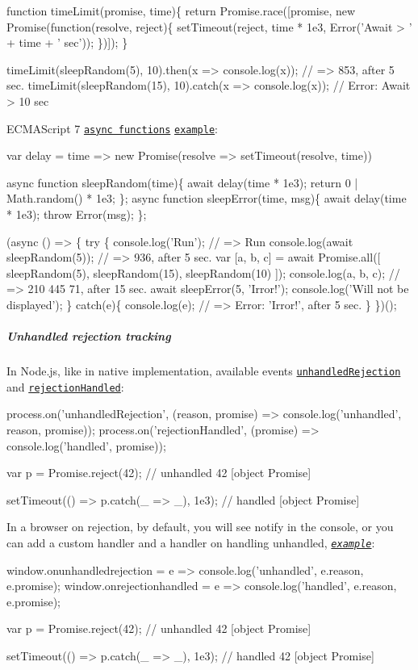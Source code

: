 \begin{DoxyCode}
function timeLimit(promise, time)\{
  return Promise.race([promise, new Promise(function(resolve, reject)\{
    setTimeout(reject, time * 1e3, Error('Await > ' + time + ' sec'));
  \})]);
\}

timeLimit(sleepRandom(5), 10).then(x => console.log(x));   // => 853, after 5 sec.
timeLimit(sleepRandom(15), 10).catch(x => console.log(x)); // Error: Await > 10 sec
\end{DoxyCode}
 E\+C\+M\+A\+Script 7 \href{https://tc39.github.io/ecmascript-asyncawait}{\tt async functions} \href{http://goo.gl/wnQS4j}{\tt example}\+: 
\begin{DoxyCode}
var delay = time => new Promise(resolve => setTimeout(resolve, time))

async function sleepRandom(time)\{
  await delay(time * 1e3);
  return 0 | Math.random() * 1e3;
\};
async function sleepError(time, msg)\{
  await delay(time * 1e3);
  throw Error(msg);
\};

(async () => \{
  try \{
    console.log('Run');                // => Run
    console.log(await sleepRandom(5)); // => 936, after 5 sec.
    var [a, b, c] = await Promise.all([
      sleepRandom(5),
      sleepRandom(15),
      sleepRandom(10)
    ]);
    console.log(a, b, c);              // => 210 445 71, after 15 sec.
    await sleepError(5, 'Irror!');
    console.log('Will not be displayed');
  \} catch(e)\{
    console.log(e);                    // => Error: 'Irror!', after 5 sec.
  \}
\})();
\end{DoxyCode}


\subparagraph*{Unhandled rejection tracking}

In Node.\+js, like in native implementation, available events \href{https://nodejs.org/api/process.html#process_event_unhandledrejection}{\tt {\ttfamily unhandled\+Rejection}} and \href{https://nodejs.org/api/process.html#process_event_rejectionhandled}{\tt {\ttfamily rejection\+Handled}}\+: 
\begin{DoxyCode}
process.on('unhandledRejection', (reason, promise) => console.log('unhandled', reason, promise));
process.on('rejectionHandled', (promise) => console.log('handled', promise));

var p = Promise.reject(42);
// unhandled 42 [object Promise]

setTimeout(() => p.catch(\_ => \_), 1e3);
// handled [object Promise]
\end{DoxyCode}
 In a browser on rejection, by default, you will see notify in the console, or you can add a custom handler and a handler on handling unhandled, \href{http://goo.gl/Wozskl}{\tt {\itshape example}}\+: 
\begin{DoxyCode}
window.onunhandledrejection = e => console.log('unhandled', e.reason, e.promise);
window.onrejectionhandled = e => console.log('handled', e.reason, e.promise);

var p = Promise.reject(42);
// unhandled 42 [object Promise]

setTimeout(() => p.catch(\_ => \_), 1e3);
// handled 42 [object Promise]
\end{DoxyCode}


